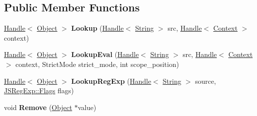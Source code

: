 \subsection*{Public Member Functions}
\begin{DoxyCompactItemize}
\item 
\hypertarget{classv8_1_1internal_1_1_compilation_cache_table_afdef7655e42bd8229bbf0019369a4860}{}\hyperlink{classv8_1_1internal_1_1_handle}{Handle}$<$ \hyperlink{classv8_1_1internal_1_1_object}{Object} $>$ {\bfseries Lookup} (\hyperlink{classv8_1_1internal_1_1_handle}{Handle}$<$ \hyperlink{classv8_1_1internal_1_1_string}{String} $>$ src, \hyperlink{classv8_1_1internal_1_1_handle}{Handle}$<$ \hyperlink{classv8_1_1internal_1_1_context}{Context} $>$ context)\label{classv8_1_1internal_1_1_compilation_cache_table_afdef7655e42bd8229bbf0019369a4860}

\item 
\hypertarget{classv8_1_1internal_1_1_compilation_cache_table_ad9e85f64f6abb506e3c6f12086c9195b}{}\hyperlink{classv8_1_1internal_1_1_handle}{Handle}$<$ \hyperlink{classv8_1_1internal_1_1_object}{Object} $>$ {\bfseries Lookup\+Eval} (\hyperlink{classv8_1_1internal_1_1_handle}{Handle}$<$ \hyperlink{classv8_1_1internal_1_1_string}{String} $>$ src, \hyperlink{classv8_1_1internal_1_1_handle}{Handle}$<$ \hyperlink{classv8_1_1internal_1_1_context}{Context} $>$ context, Strict\+Mode strict\+\_\+mode, int scope\+\_\+position)\label{classv8_1_1internal_1_1_compilation_cache_table_ad9e85f64f6abb506e3c6f12086c9195b}

\item 
\hypertarget{classv8_1_1internal_1_1_compilation_cache_table_a3cddd5ab9d8f79df18a17a244da11904}{}\hyperlink{classv8_1_1internal_1_1_handle}{Handle}$<$ \hyperlink{classv8_1_1internal_1_1_object}{Object} $>$ {\bfseries Lookup\+Reg\+Exp} (\hyperlink{classv8_1_1internal_1_1_handle}{Handle}$<$ \hyperlink{classv8_1_1internal_1_1_string}{String} $>$ source, \hyperlink{classv8_1_1internal_1_1_j_s_reg_exp_1_1_flags}{J\+S\+Reg\+Exp\+::\+Flags} flags)\label{classv8_1_1internal_1_1_compilation_cache_table_a3cddd5ab9d8f79df18a17a244da11904}

\item 
\hypertarget{classv8_1_1internal_1_1_compilation_cache_table_aaa1a061ec7d89c45fe7901eedb7d8e4c}{}void {\bfseries Remove} (\hyperlink{classv8_1_1internal_1_1_object}{Object} $\ast$value)\label{classv8_1_1internal_1_1_compilation_cache_table_aaa1a061ec7d89c45fe7901eedb7d8e4c}

\end{DoxyCompactItemize}
